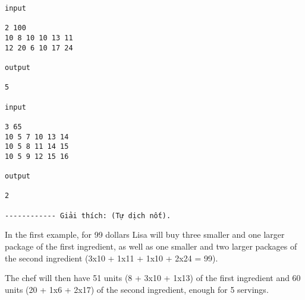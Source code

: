 \begin{verbatim}
input 
 
2 100 
10 8 10 10 13 11 
12 20 6 10 17 24 
 
output 
 
5

input 
 
3 65 
10 5 7 10 13 14 
10 5 8 11 14 15 
10 5 9 12 15 16 
 
output 
 
2

------------ Giải thích: (Tự dịch nốt).\end{verbatim}

In the first example, for 99 dollars Lisa will buy three smaller and one larger package of the first ingredient, as well as one smaller and two larger packages of the second ingredient (3x10 + 1x11 + 1x10 + 2x24 = 99).

The chef will then have 51 units (8 + 3x10 + 1x13) of the first ingredient and 60 units (20 + 1x6 + 2x17) of the second ingredient, enough for 5 servings.